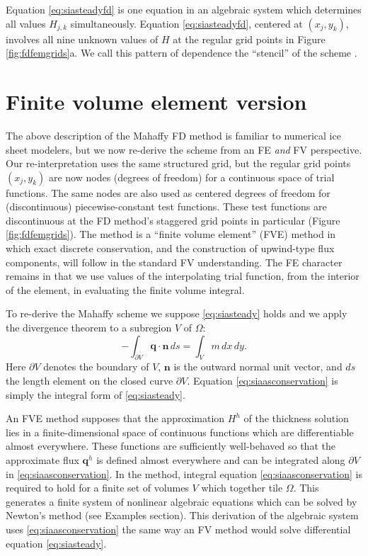 \documentclass[twocolumn,letterpaper]{igs}
\newcommand\bn{\mathbf{n}}
\newcommand\bq{\mathbf{q}}
\begin{document}
Equation \eqref{eq:siasteadyfd} is one equation in an algebraic system which determines all values $H_{j,k}$ simultaneously.  Equation \eqref{eq:siasteadyfd}, centered at $(x_j,y_k)$, involves all nine unknown values of $H$ at the regular grid points in Figure \ref{fig:fdfemgrids}a.  We call this pattern of dependence the ``stencil'' of the scheme \citep{MortonMayers2005}.


\section{Finite volume element version} \label{sec:fveinterpretation}

The above description of the Mahaffy FD method is familiar to numerical ice sheet modelers, but we now re-derive the scheme from an FE \emph{and} FV perspective.  Our re-interpretation uses the same structured grid, but the regular grid points $(x_j,y_k)$ are now nodes (degrees of freedom) for a continuous space of trial functions.  The same nodes are also used as centered degrees of freedom for (discontinuous) piecewise-constant test functions.  These test functions are discontinuous at the FD method's staggered grid points in particular (Figure \ref{fig:fdfemgrids}).  The method is a ``finite volume element'' (FVE) method in which exact discrete conservation, and the construction of upwind-type flux components, will follow in the standard FV understanding.  The FE character remains in that we use values of the interpolating trial function, from the interior of the element, in evaluating the finite volume integral.

To re-derive the Mahaffy scheme we suppose \eqref{eq:siasteady} holds and we apply the divergence theorem to a subregion $V$ of $\Omega$:
\begin{equation}
  - \int_{\partial V} \bq \cdot \bn\,ds = \int_V m\, dx\,dy. \label{eq:siaasconservation}
\end{equation}
Here $\partial V$ denotes the boundary of $V$, $\bn$ is the outward normal unit vector, and $ds$ the length element on the closed curve $\partial V$.  Equation \eqref{eq:siaasconservation} is simply the integral form of \eqref{eq:siasteady}.

An FVE method supposes that the approximation $H^h$ of the thickness solution lies in a finite-dimensional space of continuous functions which are differentiable almost everywhere.  These functions are sufficiently well-behaved so that the approximate flux $\bq^h$ is defined almost everywhere and can be integrated along $\partial V$ in \eqref{eq:siaasconservation}.  In the method, integral equation \eqref{eq:siaasconservation} is required to hold for a finite set of volumes $V$ which together tile $\Omega$.  This generates a finite system of nonlinear algebraic equations which can be solved by Newton's method (see Examples section).  This derivation of the algebraic system uses \eqref{eq:siaasconservation} the same way an FV method would solve differential equation \eqref{eq:siasteady}.
\end{document}

